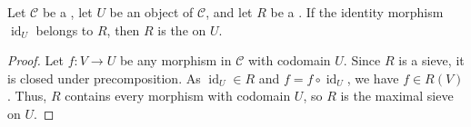 \begin{lemma} \label{lemma:sieve_containing_identity_morphism_is_maximal_sieve_on_the_object}
    Let $\mathcal{C}$ be a , let $U$ be an object of $\mathcal{C}$, and let $R$ be a .
    If the identity morphism $\operatorname{id}_U$ belongs to $R$, then $R$ is the  on $U$.
\end{lemma}

\begin{proof}
    Let $f: V \to U$ be any morphism in $\mathcal{C}$ with codomain $U$. Since $R$ is a sieve, it is closed under precomposition. As $\operatorname{id}_U \in R$ and $f = f \circ \operatorname{id}_U$, we have $f \in R(V)$. Thus, $R$ contains every morphism with codomain $U$, so $R$ is the maximal sieve on $U$.
\end{proof}
